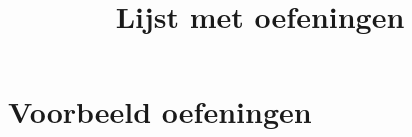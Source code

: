 \documentclass{xourse}
\title{Lijst met oefeningen}
\begin{document}
\part{Voorbeeld oefeningen}
\end{document}

